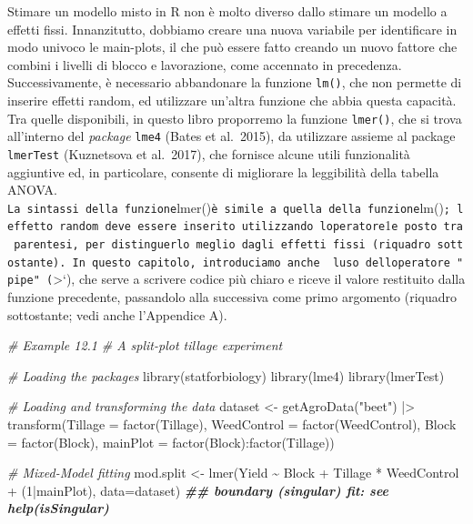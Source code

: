 \documentclass[
  12pt,
]{book}
\newenvironment{Shaded}{\begin{snugshade}}{\end{snugshade}}
\newcommand{\AttributeTok}[1]{\textcolor[rgb]{0.77,0.63,0.00}{#1}}
\newcommand{\CommentTok}[1]{\textcolor[rgb]{0.56,0.35,0.01}{\textit{#1}}}
\newcommand{\DecValTok}[1]{\textcolor[rgb]{0.00,0.00,0.81}{#1}}
\newcommand{\DocumentationTok}[1]{\textcolor[rgb]{0.56,0.35,0.01}{\textbf{\textit{#1}}}}
\newcommand{\FunctionTok}[1]{\textcolor[rgb]{0.00,0.00,0.00}{#1}}
\newcommand{\NormalTok}[1]{#1}
\newcommand{\OtherTok}[1]{\textcolor[rgb]{0.56,0.35,0.01}{#1}}
\newcommand{\SpecialCharTok}[1]{\textcolor[rgb]{0.00,0.00,0.00}{#1}}
\newcommand{\StringTok}[1]{\textcolor[rgb]{0.31,0.60,0.02}{#1}}
\begin{document}
Stimare un modello misto in R non è molto diverso dallo stimare un modello a effetti fissi. Innanzitutto, dobbiamo creare una nuova variabile per identificare in modo univoco le main-plots, il che può essere fatto creando un nuovo fattore che combini i livelli di blocco e lavorazione, come accennato in precedenza. Successivamente, è necessario abbandonare la funzione \texttt{lm()}, che non permette di inserire effetti random, ed utilizzare un'altra funzione che abbia questa capacità. Tra quelle disponibili, in questo libro proporremo la funzione \texttt{lmer()}, che si trova all'interno del \emph{package} \texttt{lme4} (Bates et al.~2015), da utilizzare assieme al package \texttt{lmerTest} (Kuznetsova et al.~2017), che fornisce alcune utili funzionalità aggiuntive ed, in particolare, consente di migliorare la leggibilità della tabella ANOVA.
\texttt{La\ sintassi\ della\ funzione}lmer()\texttt{è\ simile\ a\ quella\ della\ funzione}lm()\texttt{;\ l\textquotesingle{}effetto\ random\ deve\ essere\ inserito\ utilizzando\ l\textquotesingle{}operatore}1\textbar{}\texttt{e\ posto\ tra\ parentesi,\ per\ distinguerlo\ meglio\ dagli\ effetti\ fissi\ (riquadro\ sottostante).\ In\ questo\ capitolo,\ introduciamo\ anche\ \ l\textquotesingle{}uso\ dell\textquotesingle{}operatore\ "pipe"\ (}\textbar\textgreater`), che serve a scrivere codice più chiaro e riceve il valore restituito dalla funzione precedente, passandolo alla successiva come primo argomento (riquadro sottostante; vedi anche l'Appendice A).

\begin{Shaded}
\begin{Highlighting}[]
\CommentTok{\# Example 12.1}
\CommentTok{\# A split{-}plot tillage experiment}

\CommentTok{\# Loading the packages}
\FunctionTok{library}\NormalTok{(statforbiology)}
\FunctionTok{library}\NormalTok{(lme4)}
\FunctionTok{library}\NormalTok{(lmerTest)}

\CommentTok{\# Loading and transforming the data}
\NormalTok{dataset }\OtherTok{\textless{}{-}} \FunctionTok{getAgroData}\NormalTok{(}\StringTok{"beet"}\NormalTok{) }\SpecialCharTok{|\textgreater{}}
  \FunctionTok{transform}\NormalTok{(}\AttributeTok{Tillage =} \FunctionTok{factor}\NormalTok{(Tillage),}
            \AttributeTok{WeedControl =} \FunctionTok{factor}\NormalTok{(WeedControl),}
            \AttributeTok{Block =} \FunctionTok{factor}\NormalTok{(Block),}
            \AttributeTok{mainPlot =} \FunctionTok{factor}\NormalTok{(Block)}\SpecialCharTok{:}\FunctionTok{factor}\NormalTok{(Tillage))}

\CommentTok{\# Mixed{-}Model fitting}
\NormalTok{mod.split }\OtherTok{\textless{}{-}} \FunctionTok{lmer}\NormalTok{(Yield }\SpecialCharTok{\textasciitilde{}}\NormalTok{ Block }\SpecialCharTok{+}\NormalTok{ Tillage }\SpecialCharTok{*}\NormalTok{ WeedControl }\SpecialCharTok{+}
\NormalTok{                  (}\DecValTok{1}\SpecialCharTok{|}\NormalTok{mainPlot), }\AttributeTok{data=}\NormalTok{dataset)}
\DocumentationTok{\#\# boundary (singular) fit: see help(\textquotesingle{}isSingular\textquotesingle{})}
\end{Highlighting}
\end{Shaded}
\end{document}
